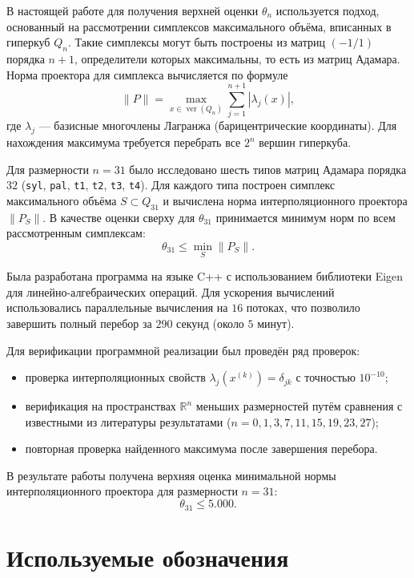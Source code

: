\documentclass[main]{subfiles}
\begin{document}
В настоящей работе для получения верхней оценки $\theta_n$ используется подход, основанный на рассмотрении симплексов максимального объёма, вписанных в гиперкуб $Q_n$. Такие симплексы могут быть построены из матриц $(-1/1)$ порядка $n+1$, определители которых максимальны, то есть из матриц Адамара. Норма проектора для симплекса вычисляется по формуле
\[
\|P\| = \max_{x \in \operatorname{ver}(Q_n)} \sum_{j=1}^{n+1} |\lambda_j(x)|,
\]
где $\lambda_j$ — базисные многочлены Лагранжа (барицентрические координаты). Для нахождения максимума требуется перебрать все $2^n$ вершин гиперкуба.
\par
Для размерности $n = 31$ было исследовано шесть типов матриц Адамара порядка $32$ (\texttt{syl}, \texttt{pal}, \texttt{t1}, \texttt{t2}, \texttt{t3}, \texttt{t4}). Для каждого типа построен симплекс максимального объёма $S \subset Q_{31}$ и вычислена норма интерполяционного проектора $\|P_S\|$. В качестве оценки сверху для $\theta_{31}$ принимается минимум норм по всем рассмотренным симплексам:
\[
\theta_{31} \le \min_{S} \|P_S\|.
\]
\par
Была разработана программа на языке C++ с использованием библиотеки Eigen для линейно-алгебраических операций. Для ускорения вычислений использовались параллельные вычисления на $16$ потоках, что позволило завершить полный перебор за $290$ секунд (около $5$ минут).
\par
Для верификации программной реализации был проведён ряд проверок:
\begin{itemize}
    \item проверка интерполяционных свойств $\lambda_j(x^{(k)}) = \delta_{jk}$ с точностью $10^{-10}$;
    \item верификация на пространствах $\mathbb{R}^n$ меньших размерностей путём сравнения с известными из литературы результатами ($n = 0, 1, 3, 7, 11, 15, 19, 23, 27$);
    \item повторная проверка найденного максимума после завершения перебора.
\end{itemize}

В результате работы получена верхняя оценка минимальной нормы интерполяционного проектора для размерности $n = 31$:
\[
\theta_{31} \le 5.000.
\]

\newpage

\section{Используемые обозначения}
\end{document}
